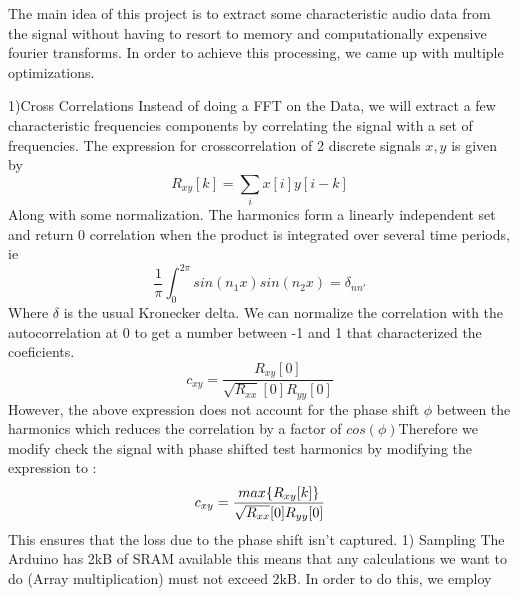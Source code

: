 
The main idea of this project is to extract some characteristic audio data from the signal without having to resort to memory and computationally expensive fourier transforms. In order to achieve this processing, we came up with multiple optimizations. 

1)Cross Correlations 
Instead of doing a FFT on the Data, we will extract a few characteristic frequencies components by correlating the signal with a set of frequencies. The expression for crosscorrelation of 2 discrete signals \(x,y\) is given by 
\begin{equation}
    R_{xy}[k] = \sum_{i} x[i]y[i-k]
\end{equation}
Along with some normalization. The harmonics form a linearly independent set and return 0 correlation when the product is integrated over several time periods, ie 
\begin{equation}
    \frac{1}{\pi} \int_0^{2\pi}sin(n_1x)sin(n_2x) = \delta_{nn'}  
\end{equation} 
Where \(\delta\) is the usual Kronecker delta. We can normalize the correlation with the autocorrelation at 0 to get a number between -1 and 1 that characterized the coeficients.
\begin{equation}
    c_{xy} = \frac{R_{xy}[0]}{\sqrt{R_{xx}}[0]R_{yy}[0] }
\end{equation} 
However, the above expression does not account for the phase shift \(\phi\) between the harmonics which reduces the correlation by a factor of \(cos(\phi)\)Therefore we modify check the signal with phase shifted test harmonics by modifying the expression to :
\begin{equation}
    c_{xy} = \frac{\mathnormal{max}\{R_{xy}[k]\}}{\sqrt{R_{xx}}[0]R_{yy}[0] }
\end{equation}
This ensures that the loss due to the phase shift isn't captured. 
1) Sampling 
The Arduino has 2kB of SRAM available this means that any calculations we want to do (Array multiplication) must not exceed 2kB. In order to do this, we employ  
